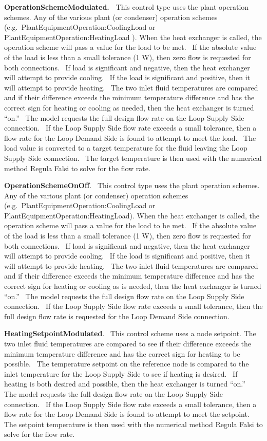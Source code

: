 \textbf{OperationSchemeModulated.~} This control type uses the plant operation schemes. Any of the various plant (or condenser) operation schemes (e.g.~PlantEquipmentOperation:CoolingLoad or PlantEquipmentOperation:HeatingLoad ). When the heat exchanger is called, the operation scheme will pass a value for the load to be met.~ If the absolute value of the load is less than a small tolerance (1 W), then zero flow is requested for both connections.~ If load is significant and negative, then the heat exchanger will attempt to provide cooling.~ If the load is significant and positive, then it will attempt to provide heating.~ The two inlet fluid temperatures are compared and if their difference exceeds the minimum temperature difference and has the correct sign for heating or cooling as needed, then the heat exchanger is turned ``on.''~ The model requests the full design flow rate on the Loop Supply Side connection.~ If the Loop Supply Side flow rate exceeds a small tolerance, then a flow rate for the Loop Demand Side is found to attempt to meet the load.~ The load value is converted to a target temperature for the fluid leaving the Loop Supply Side connection.~ The target temperature is then used with the numerical method Regula Falsi to solve for the flow rate.

\textbf{OperationSchemeOnOff}.~ This control type uses the plant operation schemes. Any of the various plant (or condenser) operation schemes (e.g.~PlantEquipmentOperation:CoolingLoad or PlantEquipmentOperation:HeatingLoad). When the heat exchanger is called, the operation scheme will pass a value for the load to be met.~ If the absolute value of the load is less than a small tolerance (1 W), then zero flow is requested for both connections.~ If load is significant and negative, then the heat exchanger will attempt to provide cooling.~ If the load is significant and positive, then it will attempt to provide heating.~ The two inlet fluid temperatures are compared and if their difference exceeds the minimum temperature difference and has the correct sign for heating or cooling as is needed, then the heat exchanger is turned ``on.''~ The model requests the full design flow rate on the Loop Supply Side connection.~ If the Loop Supply Side flow rate exceeds a small tolerance, then the full design flow rate is requested for the Loop Demand Side connection.

\textbf{HeatingSetpointModulated}.~ This control scheme uses a node setpoint. The two inlet fluid temperatures are compared to see if their difference exceeds the minimum temperature difference and has the correct sign for heating to be possible.~ The temperature setpoint on the reference node is compared to the inlet temperature for the Loop Supply Side to see if heating is desired.~ If heating is both desired and possible, then the heat exchanger is turned ``on.''~ The model requests the full design flow rate on the Loop Supply Side connection.~ If the Loop Supply Side flow rate exceeds a small tolerance, then a flow rate for the Loop Demand Side is found to attempt to meet the setpoint.~ The setpoint temperature is then used with the numerical method Regula Falsi to solve for the flow rate.

